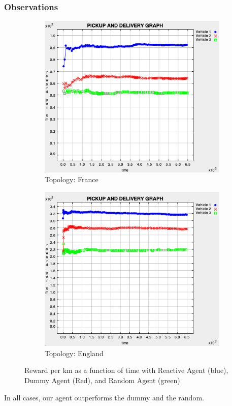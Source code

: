 \documentclass[11pt]{article}
\begin{document}
\subsubsection{Observations}
\begin{figure}[ht]
\begin{centering}
  \begin{subfigure}[t]{0.36\textwidth}
    \includegraphics[width=\textwidth, frame]{Fig3a.png}
    \caption{Topology: France}
    \label{fig:3a}
  \end{subfigure}
  \begin{subfigure}[t]{0.35\textwidth}
    \includegraphics[width=\textwidth, frame]{Fig3b.png}
    \caption{Topology: England}
    \label{fig:3b}
  \end{subfigure}
  \label{fig:5}\caption{Reward per km as a function of time with Reactive Agent (blue), Dummy Agent (Red), and Random Agent (green)}
  \end{centering}
\end{figure}

\noindent In all cases, our agent outperforms the dummy and the random.
\end{document}
